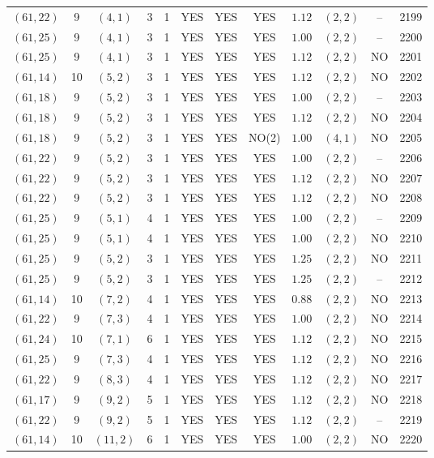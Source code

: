 \begin{longtable}{|c|c|c|c|c|c|c|c|c|c|c|c|}
$(61,22)$ & 9 & $(4,1)$ & 3 & 1 & YES & YES & YES & $1.12$ & $(2,2)$ & -- & 2199\\
$(61,25)$ & 9 & $(4,1)$ & 3 & 1 & YES & YES & YES & $1.00$ & $(2,2)$ & -- & 2200\\
$(61,25)$ & 9 & $(4,1)$ & 3 & 1 & YES & YES & YES & $1.12$ & $(2,2)$ & NO & 2201\\
$(61,14)$ & 10 & $(5,2)$ & 3 & 1 & YES & YES & YES & $1.12$ & $(2,2)$ & NO & 2202\\
$(61,18)$ & 9 & $(5,2)$ & 3 & 1 & YES & YES & YES & $1.00$ & $(2,2)$ & -- & 2203\\
$(61,18)$ & 9 & $(5,2)$ & 3 & 1 & YES & YES & YES & $1.12$ & $(2,2)$ & NO & 2204\\
$(61,18)$ & 9 & $(5,2)$ & 3 & 1 & YES & YES & NO(2) & $1.00$ & $(4,1)$ & NO & 2205\\
$(61,22)$ & 9 & $(5,2)$ & 3 & 1 & YES & YES & YES & $1.00$ & $(2,2)$ & -- & 2206\\
$(61,22)$ & 9 & $(5,2)$ & 3 & 1 & YES & YES & YES & $1.12$ & $(2,2)$ & NO & 2207\\
$(61,22)$ & 9 & $(5,2)$ & 3 & 1 & YES & YES & YES & $1.12$ & $(2,2)$ & NO & 2208\\
$(61,25)$ & 9 & $(5,1)$ & 4 & 1 & YES & YES & YES & $1.00$ & $(2,2)$ & -- & 2209\\
$(61,25)$ & 9 & $(5,1)$ & 4 & 1 & YES & YES & YES & $1.00$ & $(2,2)$ & NO & 2210\\
$(61,25)$ & 9 & $(5,2)$ & 3 & 1 & YES & YES & YES & $1.25$ & $(2,2)$ & NO & 2211\\
$(61,25)$ & 9 & $(5,2)$ & 3 & 1 & YES & YES & YES & $1.25$ & $(2,2)$ & -- & 2212\\
$(61,14)$ & 10 & $(7,2)$ & 4 & 1 & YES & YES & YES & $0.88$ & $(2,2)$ & NO & 2213\\
$(61,22)$ & 9 & $(7,3)$ & 4 & 1 & YES & YES & YES & $1.00$ & $(2,2)$ & NO & 2214\\
$(61,24)$ & 10 & $(7,1)$ & 6 & 1 & YES & YES & YES & $1.12$ & $(2,2)$ & NO & 2215\\
$(61,25)$ & 9 & $(7,3)$ & 4 & 1 & YES & YES & YES & $1.12$ & $(2,2)$ & NO & 2216\\
$(61,22)$ & 9 & $(8,3)$ & 4 & 1 & YES & YES & YES & $1.12$ & $(2,2)$ & NO & 2217\\
$(61,17)$ & 9 & $(9,2)$ & 5 & 1 & YES & YES & YES & $1.12$ & $(2,2)$ & NO & 2218\\
$(61,22)$ & 9 & $(9,2)$ & 5 & 1 & YES & YES & YES & $1.12$ & $(2,2)$ & -- & 2219\\
$(61,14)$ & 10 & $(11,2)$ & 6 & 1 & YES & YES & YES & $1.00$ & $(2,2)$ & NO & 2220\\

\end{longtable}
